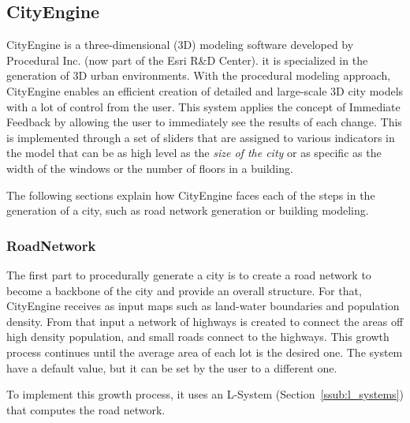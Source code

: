 
\subsection{CityEngine \cite{Parish2001} \cite{Muller2006}}
\label{sub:cityengine}

CityEngine is a three-dimensional (3D) modeling software developed by Procedural Inc. (now part of the Esri R\&D Center). it is specialized in the generation of 3D urban environments. With the procedural modeling approach, CityEngine enables an efficient creation of detailed and large-scale 3D city models with a lot of control from the user. This system applies the concept of Immediate Feedback by allowing the user to immediately see the results of each change. This is implemented through a set of sliders that are assigned to various indicators in the model that can be as high level as the \emph{size of the city} or as specific as the width of the windows or the number of floors in a building.

The following sections explain how CityEngine faces each of the steps in the generation of a city, such as road network generation or building modeling.

\subsubsection{RoadNetwork} %
\label{ssub:roadnetwork1}


The first part to procedurally generate a city is to create a road network to become a backbone of the city and provide an overall structure. For that, CityEngine receives as input maps such as land-water boundaries and population
density. From that input a network of highways is created to connect the areas off high density population, and small roads connect to the highways.
This growth process continues until the average area of each lot is the desired one. The system have a default value, but it can be set by the user to a different one.

To implement this growth process, it uses an L-System (Section~\ref{ssub:l_systems}) that computes the road network.


